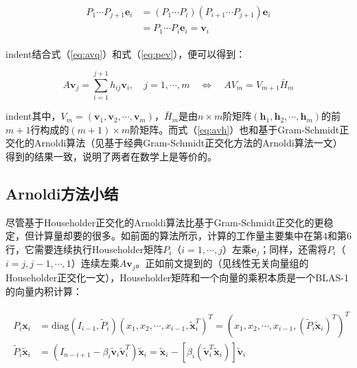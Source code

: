 \documentclass[UTF8,nofonts]{ctexart}
\begin{document}
\begin{align}
\label{eq:pev}
\begin{split}
P_1\cdots P_{j+1}\boldsymbol{e}_i&=(P_1\cdots P_i)(P_{i+1}\cdots P_{j+1})\boldsymbol{e}_i \\
&=P_1\cdots P_i\boldsymbol{e}_i=\boldsymbol{v}_i
\end{split}
\end{align}

indent结合式（\ref{eq:avq}）和式（\ref{eq:pev}），便可以得到：

\begin{equation}
\label{eq:avh}
A\boldsymbol{v}_j=\sum_{i=1}^{j+1}h_{ij}\boldsymbol{v}_i,\quad j=1,\cdots,m\quad\Longleftrightarrow\quad AV_m=V_{m+1}\bar{H}_m
\end{equation}

indent其中，$V_m=(\boldsymbol{v}_1,\boldsymbol{v}_2,\cdots,\boldsymbol{v}_m)$，$\bar{H}_m$是由$n \times m$阶矩阵$(\boldsymbol{h}_1,\boldsymbol{h}_2,\cdots,\boldsymbol{h}_m)$的前$m+1$行构成的$(m+1)\times m$阶矩阵。而式（\ref{eq:avh}）也和基于Gram-Schmidt正交化的Arnoldi算法（见基于经典Gram-Schmidt正交化方法的Arnoldi算法一文）得到的结果一致，说明了两者在数学上是等价的。

\subsection*{Arnoldi方法小结}

尽管基于Householder正交化的Arnoldi算法比基于Gram-Schmidt正交化的更稳定，但计算量却要的很多。如前面的算法所示，计算的工作量主要集中在第$4$和第$6$行，它需要连续执行Householder矩阵$P_i$（$i=1,\cdots,j$）左乘$\boldsymbol{e}_j$；同样，还需将$P_i$（$i=j,j-1,\cdots,1$）连续左乘$A\boldsymbol{v}_j$。正如前文提到的（见线性无关向量组的Householder正交化一文），Householder矩阵和一个向量的乘积本质是一个BLAS-1的向量内积计算：

\begin{align}
\label{eq:pixi}
\begin{split}
P_{i}\boldsymbol{x}_i&=\text{diag}(I_{i-1},\tilde{P}_i)(x_1,x_2,\cdots,x_{i-1},\tilde{\boldsymbol{x}}^T_i)^T=\left(x_1,x_2,\cdots,x_{i-1},(\tilde{P}_i\tilde{\boldsymbol{x}}_i)^T\right)^T \\
\tilde{P}_i\tilde{\boldsymbol{x}}_i&=\left(I_{n-i+1}-\beta_i\tilde{\boldsymbol{v}}_i\tilde{\boldsymbol{v}}_i^T\right)\tilde{\boldsymbol{x}}_i=\tilde{\boldsymbol{x}}_i-\left[\beta_i(\tilde{\boldsymbol{v}}_i^T\tilde{\boldsymbol{x}}_i)\right]\tilde{\boldsymbol{v}}_i
\end{split}
\end{align}
\end{document}
